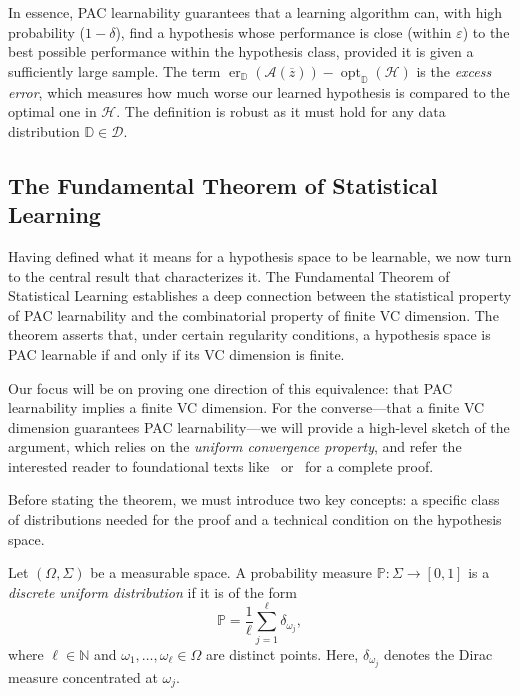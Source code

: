 In essence, PAC learnability guarantees that a learning algorithm can, with high probability ($1-\delta$), find a hypothesis whose performance is close (within $\varepsilon$) to the best possible performance within the hypothesis class, provided it is given a sufficiently large sample. The term $\operatorname{er}_{\mathbb{D}}(\mathcal{A}(\overline{z})) - \operatorname{opt}_{\mathbb{D}}(\mathcal{H})$ is the \emph{excess error}, which measures how much worse our learned hypothesis is compared to the optimal one in $\mathcal{H}$. The definition is robust as it must hold for any data distribution $\mathbb{D} \in \mathcal{D}$.

\subsection{The Fundamental Theorem of Statistical Learning}

Having defined what it means for a hypothesis space to be learnable, we now turn to the central result that characterizes it. The Fundamental Theorem of Statistical Learning establishes a deep connection between the statistical property of PAC learnability and the combinatorial property of finite VC dimension. The theorem asserts that, under certain regularity conditions, a hypothesis space is PAC learnable if and only if its VC dimension is finite.

Our focus will be on proving one direction of this equivalence: that PAC learnability implies a finite VC dimension. For the converse—that a finite VC dimension guarantees PAC learnability—we will provide a high-level sketch of the argument, which relies on the \emph{uniform convergence property}, and refer the interested reader to foundational texts like~\cite{AnthonyBartlett1999} or~\cite{UnderstandinMachineLearning} for a complete proof.

Before stating the theorem, we must introduce two key concepts: a specific class of distributions needed for the proof and a technical condition on the hypothesis space.

\begin{definition}
    Let $(\Omega, \Sigma)$ be a measurable space. A probability measure $\mathbb{P}: \Sigma \to [0,1]$ is a \emph{discrete uniform distribution} if it is of the form
    \[
        \mathbb{P} = \frac{1}{\ell} \sum_{j=1}^{\ell} \delta_{\omega_j},
    \]
    where $\ell \in \mathbb{N}$ and $\omega_1, \dots, \omega_\ell \in \Omega$ are distinct points. Here, $\delta_{\omega_j}$ denotes the Dirac measure concentrated at $\omega_j$.
\end{definition}

